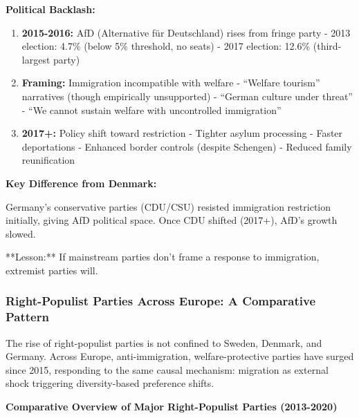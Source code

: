 \textbf{Political Backlash:}

\begin{enumerate}

\item \textbf{2015-2016:} AfD (Alternative für Deutschland) rises from fringe party
   - 2013 election: 4.7\% (below 5\% threshold, no seats)
   - 2017 election: 12.6\% (third-largest party)

\item \textbf{Framing:} Immigration incompatible with welfare
   - ``Welfare tourism'' narratives (though empirically unsupported)
   - ``German culture under threat''
   - ``We cannot sustain welfare with uncontrolled immigration''

\item \textbf{2017+:} Policy shift toward restriction
   - Tighter asylum processing
   - Faster deportations
   - Enhanced border controls (despite Schengen)
   - Reduced family reunification

\end{enumerate}

\textbf{Key Difference from Denmark:}

Germany's conservative parties (CDU/CSU) resisted immigration restriction initially, giving AfD political space. Once CDU shifted (2017+), AfD's growth slowed.

**Lesson:** If mainstream parties don't frame a response to immigration, extremist parties will.

\subsubsection{Right-Populist Parties Across Europe: A Comparative Pattern}

The rise of right-populist parties is not confined to Sweden, Denmark, and Germany. Across Europe, anti-immigration, welfare-protective parties have surged since 2015, responding to the same causal mechanism: migration as external shock triggering diversity-based preference shifts.

\textbf{Comparative Overview of Major Right-Populist Parties (2013-2020)}

